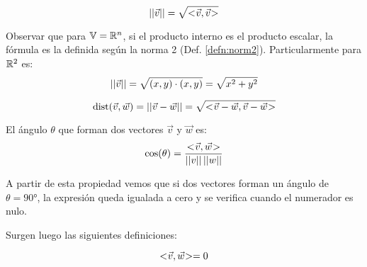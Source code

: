 \begin{mdframed}[style=DefinitionFrame]
    \begin{defn}
    \end{defn}
    \begin{equation*}
        {\left|\left| {\Vec{v}} \right|\right|} = \sqrt{<\hspace{-0.8mm}\Vec{v},\Vec{v}\hspace{-0.8mm}>}
    \end{equation*}
\end{mdframed}

Observar que para $\mathbb{V} = \mathbb{R}^n$, si el producto interno es el producto escalar, la fórmula es la definida según la norma 2 (Def. \ref{defn:norm2}).
Particularmente para $\mathbb{R}^2$ es:
\begin{equation*}
    {\left|\left| {\Vec{v}} \right|\right|} = \sqrt{(x,y) \cdot (x,y)} = \sqrt{x^2+y^2}
\end{equation*}

\begin{mdframed}[style=DefinitionFrame]
    \begin{defn}
    \end{defn}
    \begin{equation*}
        \operatorname{dist}(\Vec{v},\Vec{w}) = {\left|\left| {\Vec{v}-\Vec{w}} \right|\right|} = \sqrt{<\hspace{-0.8mm}\Vec{v}-\Vec{w},\Vec{v}-\Vec{w}\hspace{-0.8mm}>}
    \end{equation*}
\end{mdframed}

\begin{mdframed}[style=PropertyFrame]
    \begin{prop}
    \end{prop}
    El ángulo $\theta$ que forman dos vectores $\Vec{v}$ y $\Vec{w}$ es:
    \begin{equation*}
        \cos(\theta) = \frac{<\hspace{-0.8mm}\Vec{v},\Vec{w}\hspace{-0.8mm}>}{{\left|\left| {v} \right|\right|} \, {\left|\left| {w} \right|\right|}}
    \end{equation*}
\end{mdframed}

A partir de esta propiedad vemos que si dos vectores forman un ángulo de $\theta=\ang{90}$, la expresión queda igualada a cero y se verifica cuando el numerador es nulo.

Surgen luego las siguientes definiciones:

\begin{mdframed}[style=DefinitionFrame]
    \begin{defn}
    \end{defn}
    \begin{equation*}
        <\hspace{-0.8mm}\Vec{v},\Vec{w}\hspace{-0.8mm}> = 0
    \end{equation*}
\end{mdframed}

